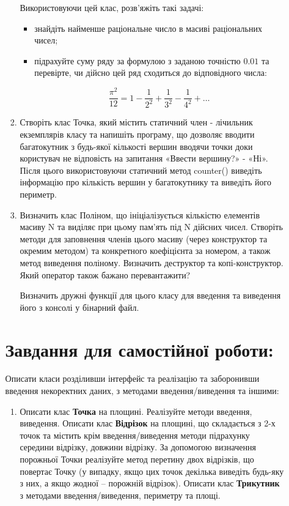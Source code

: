 \documentclass[a5paper,titlepage,openany,twoside,
]
{book_unv}%
\begin{document}
\begin{enumerate}
\begin{enumerate}
\begin{enumerate}
Використовуючи цей клас, розв'яжіть такі задачі:
\begin{itemize}
\item
знайдіть найменше раціональне число в масиві раціональних чисел;
\item
підрахуйте суму ряду за формулою з заданою точністю $0.01$ та
перевірте, чи дійсно цей ряд сходиться до відповідного числа:

\[\frac{\pi^{2}}{12} = 1 - \frac{1}{2^{2}} + \frac{1}{3^{2}} - \frac{1}{4^{2}} + \ldots\]

\end{itemize}

\item
  Створіть клас Точка, який містить статичний член - лічильник екземплярів класу
 та напишіть програму, що дозволяє вводити багатокутник з будь-якої кількості вершин вводячи точки доки
  користувач не відповість на запитання «Ввести вершину?» - «Ні». Після
  цього використовуючи статичний метод counter()
  виведіть інформацію про кількість вершин у багатокутнику та
  виведіть його периметр.
\item
  Визначить клас Поліном, що ініціалізується кількістю елементів масиву
  N та виділяє при цьому пам'ять під N дійсних чисел. Створіть методи
  для заповнення членів цього масиву (через конструктор та окремим
  методом) та конкретного коефіцієнта за номером, а також метод виведення
поліному. Визначить деструктор та копі-конструктор. Який оператор також 
бажано перевантажити?

  Визначить дружні функції для цього класу для введення та виведення
його з консолі у бінарний файл.


\end{enumerate}

\section{Завдання для самостійної роботи:}

Описати класи розділивши інтерфейс та реалізацію та заборонивши введення
некоректних даних, з методами введення/виведення та іншими:

\begin{enumerate}
\def\labelenumi{\arabic{enumi})}
\setcounter{enumi}{3}
\item
  Описати клас \textbf{Точка} на площині. Реалізуйте методи введення,
  виведення. Описати клас \textbf{Відрізок} на площині, що складається
  з 2-х точок та містить крім введення/виведення методи підрахунку
  середини відрізку, довжини відрізку. За допомогою визначення
  порожньої Точки реалізуйте метод перетину двох відрізків, що повертає
  Точку (у випадку, якщо цих точок декілька виведіть будь-яку з них, а
  якщо жодної -- порожній відрізок). Описати клас \textbf{Трикутник} з 
  методами введення/виведення, периметру та площі.
 

\end{enumerate}
\end{enumerate}
\end{enumerate}
\end{document}
